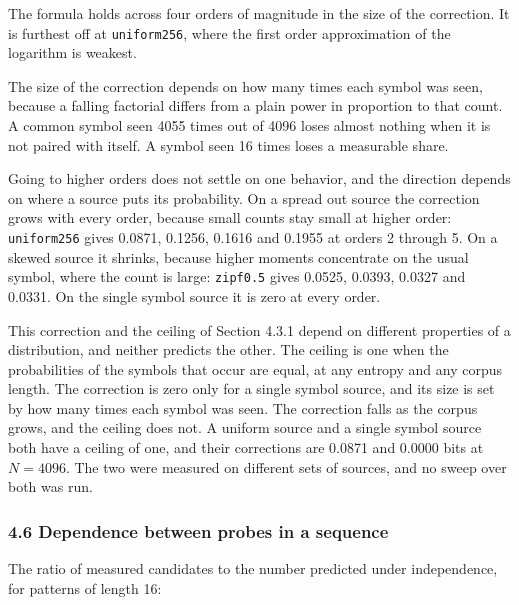 The formula holds across four orders of magnitude in the size of the correction. It is furthest off at \texttt{uniform256}, where the first order approximation of the logarithm is weakest.

The size of the correction depends on how many times each symbol was seen, because a falling factorial differs from a plain power in proportion to that count. A common symbol seen 4055 times out of 4096 loses almost nothing when it is not paired with itself. A symbol seen 16 times loses a measurable share.

Going to higher orders does not settle on one behavior, and the direction depends on where a source puts its probability. On a spread out source the correction grows with every order, because small counts stay small at higher order: \texttt{uniform256} gives 0.0871, 0.1256, 0.1616 and 0.1955 at orders 2 through 5. On a skewed source it shrinks, because higher moments concentrate on the usual symbol, where the count is large: \texttt{zipf0.\allowbreak{}5} gives 0.0525, 0.0393, 0.0327 and 0.0331. On the single symbol source it is zero at every order.

This correction and the ceiling of Section 4.3.1 depend on different properties of a distribution, and neither predicts the other. The ceiling is one when the probabilities of the symbols that occur are equal, at any entropy and any corpus length. The correction is zero only for a single symbol source, and its size is set by how many times each symbol was seen. The correction falls as the corpus grows, and the ceiling does not. A uniform source and a single symbol source both have a ceiling of one, and their corrections are 0.0871 and 0.0000 bits at \(N = 4096\). The two were measured on different sets of sources, and no sweep over both was run.

\subsubsection{4.6 Dependence between probes in a sequence}

The ratio of measured candidates to the number predicted under independence, for patterns of length 16:

